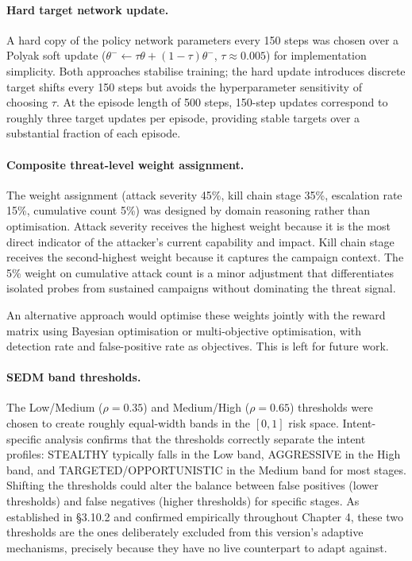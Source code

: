 \paragraph{Hard target network update.}
A hard copy of the policy network parameters every 150 steps was chosen
over a Polyak soft update ($\theta^- \leftarrow \tau\theta + (1-\tau)\theta^-$,
$\tau \approx 0.005$) for implementation simplicity.
Both approaches stabilise training; the hard update introduces discrete
target shifts every 150 steps but avoids the hyperparameter sensitivity
of choosing $\tau$.
At the episode length of 500 steps, 150-step updates correspond to roughly
three target updates per episode, providing stable targets over a substantial
fraction of each episode.

\paragraph{Composite threat-level weight assignment.}
The weight assignment (attack severity 45\%, kill chain stage 35\%,
escalation rate 15\%, cumulative count 5\%) was designed by domain
reasoning rather than optimisation.
Attack severity receives the highest weight because it is the most direct
indicator of the attacker's current capability and impact.
Kill chain stage receives the second-highest weight because it captures the
campaign context.
The 5\% weight on cumulative attack count is a minor adjustment that
differentiates isolated probes from sustained campaigns without dominating
the threat signal.

An alternative approach would optimise these weights jointly with the reward
matrix using Bayesian optimisation or multi-objective optimisation, with
detection rate and false-positive rate as objectives.
This is left for future work.

\paragraph{SEDM band thresholds.}
The Low/Medium ($\rho = 0.35$) and Medium/High ($\rho = 0.65$) thresholds
were chosen to create roughly equal-width bands in the $[0, 1]$ risk space.
Intent-specific analysis confirms that the thresholds correctly separate
the intent profiles: STEALTHY typically falls in the Low band, AGGRESSIVE
in the High band, and TARGETED/OPPORTUNISTIC in the Medium band for most
stages.
Shifting the thresholds could alter the balance between false positives
(lower thresholds) and false negatives (higher thresholds) for specific
stages.
As established in \S3.10.2 and confirmed empirically throughout Chapter 4,
these two thresholds are the ones deliberately excluded from this
version's adaptive mechanisms, precisely because they have no live
counterpart to adapt against.

